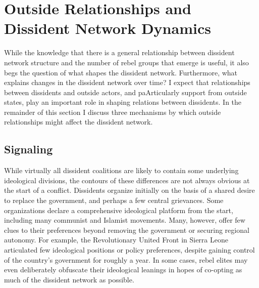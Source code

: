 \section{Outside Relationships and Dissident Network Dynamics}

While the knowledge that there is a general relationship between dissident network structure and the number of rebel groups that emerge is useful, it also begs the question of what shapes the dissident network. Furthermore, what explains changes in the dissident network over time? I expect that relationships between dissidents and outside actors, and paArticularly support from outside states, play an important role in shaping relations between dissidents. In the remainder of this section I discuss three mechanisms by which outside relationships might affect the dissident network.

\subsection{Signaling}

While virtually all dissident coalitions are likely to contain some underlying ideological divisions, the contours of these differences are not always obvious at the start of a conflict. Dissidents organize initially on the basis of a shared desire to replace the government, and perhaps a few central grievances. Some organizations declare a  comprehensive ideological platform from the start, including many communist and Islamist movements. Many, however, offer few clues to their preferences beyond removing the government or securing regional autonomy. For example, the Revolutionary United Front in Sierra Leone articulated few ideological positions or policy preferences, despite gaining control of the country's government for roughly a year. In some cases, rebel elites may even deliberately obfuscate their ideological leanings in hopes of co-opting as much of the dissident network as possible.

